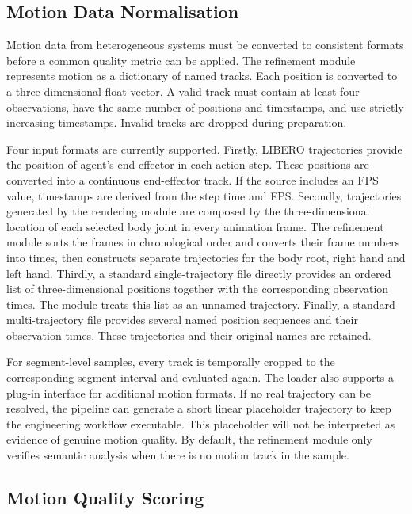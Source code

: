 \documentclass[11pt,oneside]{report}
\begin{document}
\subsection{Motion Data Normalisation}

Motion data from heterogeneous systems must be converted to consistent formats before a common quality metric can be applied. The refinement module represents motion as a dictionary of named tracks. Each position is converted to a three-dimensional float vector. A valid track must contain at least four observations, have the same number of positions and timestamps, and use strictly increasing timestamps. Invalid tracks are dropped during preparation.

Four input formats are currently supported. Firstly, LIBERO trajectories provide the position of agent’s end effector in each action step. These positions are converted into a continuous end-effector track. If the source includes an FPS value, timestamps are derived from the step time and FPS. Secondly, trajectories generated by the rendering module are composed by the three-dimensional location of each selected body joint in every animation frame. The refinement module sorts the frames in chronological order and converts their frame numbers into times, then constructs separate trajectories for the body root, right hand and left hand. Thirdly, a standard single-trajectory file directly provides an ordered list of three-dimensional positions together with the corresponding observation times. The module treats this list as an unnamed trajectory. Finally, a standard multi-trajectory file provides several named position sequences and their observation times. These trajectories and their original names are retained.

For segment-level samples, every track is temporally cropped to the corresponding segment interval and evaluated again. The loader also supports a plug-in interface for additional motion formats. If no real trajectory can be resolved, the pipeline can generate a short linear placeholder trajectory to keep the engineering workflow executable. This placeholder will not be interpreted as evidence of genuine motion quality. By default, the refinement module only verifies semantic analysis when there is no motion track in the sample.

\subsection{Motion Quality Scoring}
\end{document}
